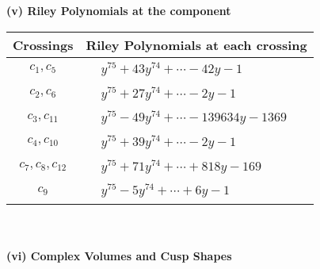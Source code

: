 \documentclass[1p]{elsarticle_modified}
\theoremstyle{definition}
\begin{document}
\newpage\renewcommand{\arraystretch}{1}
\flushleft \textbf{(v) Riley Polynomials at the component}\newline \\
\begin{tabular}{m{50pt}|m{274pt}}
Crossings & \hspace{64pt}Riley Polynomials at each crossing \\
\hline $$\begin{aligned}c_{1},c_{5}\end{aligned}$$&$\begin{aligned}
&y^{75}+43 y^{74}+\cdots-42 y-1
\end{aligned}$\\
\hline $$\begin{aligned}c_{2},c_{6}\end{aligned}$$&$\begin{aligned}
&y^{75}+27 y^{74}+\cdots-2 y-1
\end{aligned}$\\
\hline $$\begin{aligned}c_{3},c_{11}\end{aligned}$$&$\begin{aligned}
&y^{75}-49 y^{74}+\cdots-139634 y-1369
\end{aligned}$\\
\hline $$\begin{aligned}c_{4},c_{10}\end{aligned}$$&$\begin{aligned}
&y^{75}+39 y^{74}+\cdots-2 y-1
\end{aligned}$\\
\hline $$\begin{aligned}c_{7},c_{8},c_{12}\end{aligned}$$&$\begin{aligned}
&y^{75}+71 y^{74}+\cdots+818 y-169
\end{aligned}$\\
\hline $$\begin{aligned}c_{9}\end{aligned}$$&$\begin{aligned}
&y^{75}-5 y^{74}+\cdots+6 y-1
\end{aligned}$\\
\hline
\end{tabular}\\~\\
\newpage\flushleft \textbf{(vi) Complex Volumes and Cusp Shapes}
\end{document}
